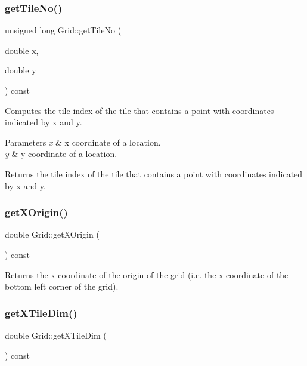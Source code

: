\subsubsection{\texorpdfstring{getTileNo()}{getTileNo()}\hspace{0.1cm}{\footnotesize\ttfamily [2/2]}}
{\footnotesize\ttfamily unsigned long Grid\+::get\+Tile\+No (\begin{DoxyParamCaption}\item[{double}]{x,  }\item[{double}]{y }\end{DoxyParamCaption}) const}

Computes the tile index of the tile that contains a point with coordinates indicated by x and y. 
\begin{DoxyParams}{Parameters}
{\em x} & x coordinate of a location. \\
\hline
{\em y} & y coordinate of a location. \\
\hline
\end{DoxyParams}
\begin{DoxyReturn}{Returns}
the tile index of the tile that contains a point with coordinates indicated by x and y. 
\end{DoxyReturn}
\mbox{\label{class_grid_a08b534c7f8e1099a6903bf08d9727842}} 
\subsubsection{\texorpdfstring{getXOrigin()}{getXOrigin()}}
{\footnotesize\ttfamily double Grid\+::get\+X\+Origin (\begin{DoxyParamCaption}{ }\end{DoxyParamCaption}) const}

\begin{DoxyReturn}{Returns}
the x coordinate of the origin of the grid (i.\+e. the x coordinate of the bottom left corner of the grid). 
\end{DoxyReturn}
\mbox{\label{class_grid_a1c5b9ad91fac264bcdd67f99bc93f663}} 
\subsubsection{\texorpdfstring{getXTileDim()}{getXTileDim()}}
{\footnotesize\ttfamily double Grid\+::get\+X\+Tile\+Dim (\begin{DoxyParamCaption}{ }\end{DoxyParamCaption}) const}

